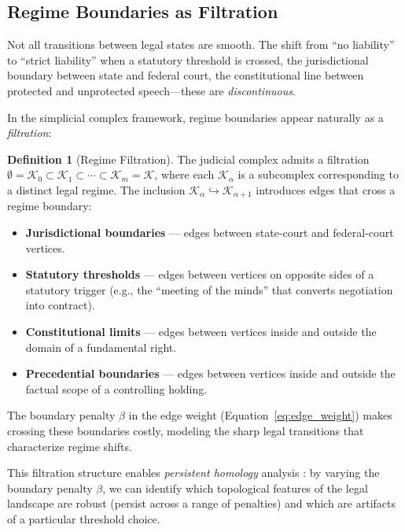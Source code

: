 \documentclass[12pt]{article}
\theoremstyle{definition}
\newtheorem{definition}[theorem]{Definition}
\theoremstyle{remark}
\begin{document}
\subsection{Regime Boundaries as Filtration}

Not all transitions between legal states are smooth.  The shift from ``no liability'' to ``strict liability'' when a statutory threshold is crossed, the jurisdictional boundary between state and federal court, the constitutional line between protected and unprotected speech---these are \emph{discontinuous}.

In the simplicial complex framework, regime boundaries appear naturally as a \emph{filtration}:

\begin{definition}[Regime Filtration]
\label{def:filtration}
The judicial complex admits a filtration $\emptyset = \mathcal{K}_0 \subset \mathcal{K}_1 \subset \cdots \subset \mathcal{K}_m = \mathcal{K}$, where each $\mathcal{K}_\alpha$ is a subcomplex corresponding to a distinct legal regime.  The inclusion $\mathcal{K}_\alpha \hookrightarrow \mathcal{K}_{\alpha+1}$ introduces edges that cross a regime boundary:
\begin{itemize}
    \item \textbf{Jurisdictional boundaries} --- edges between state-court and federal-court vertices.
    \item \textbf{Statutory thresholds} --- edges between vertices on opposite sides of a statutory trigger (e.g., the ``meeting of the minds'' that converts negotiation into contract).
    \item \textbf{Constitutional limits} --- edges between vertices inside and outside the domain of a fundamental right.
    \item \textbf{Precedential boundaries} --- edges between vertices inside and outside the factual scope of a controlling holding.
\end{itemize}
The boundary penalty $\beta$ in the edge weight (Equation~\ref{eq:edge_weight}) makes crossing these boundaries costly, modeling the sharp legal transitions that characterize regime shifts.
\end{definition}

This filtration structure enables \emph{persistent homology} analysis \cite{edelsbrunner2010}: by varying the boundary penalty $\beta$, we can identify which topological features of the legal landscape are robust (persist across a range of penalties) and which are artifacts of a particular threshold choice.
\end{document}
